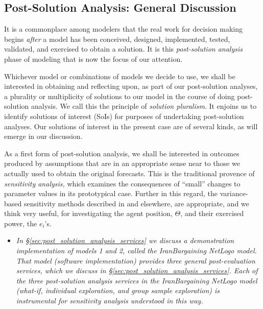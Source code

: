 


\subsection{Post-Solution Analysis: General Discussion}

It is a commonplace among modelers that the real work for decision making begins \emph{after} a model has been conceived, designed, implemented, tested, validated, and exercised to obtain a solution. It is this \emph{post-solution analysis} phase of modeling that is now the focus of our attention.

Whichever model or combinations of models we decide to use, we shall be interested  in obtaining and reflecting upon, as part of our  post-solution analyses, a plurality or multiplicity of solutions to our model in the course of doing post-solution analysis. We call this the principle of \emph{solution pluralism}. It enjoins us to identify solutions of interest (SoIs) for purposes of undertaking post-solution analyses. Our solutions of interest in the present case  are  of several kinds, as will emerge in our discussion.  

As a first form of post-solution analysis, we shall be interested in outcomes produced by assumptions that are in an appropriate sense near to those we actually used to obtain the original forecasts. This is the traditional provence of \emph{sensitivity analysis,} which examines the consequences of ``small'' changes to parameter values in its prototypical case.  Further in this regard, the variance-based sensitivity methods described in 
\cite{saltelli_etal_2000,saltelli_etal_2004,saltelli_etal_2008,saltelli_annoni_etal_2010} and elsewhere, are  appropriate, and we think very useful, for investigating the agent   {position}, $\Theta$, and their   {exercised power}, the $e_i$'s.


\begin{itemize}
\item {\it In \S\ref{sec:post_solution_analysis_services} we discuss a demonstration implementation of models 1 and 2, called the IranBargaining NetLogo model. That model (software implementation) provides three general post-evaluation services, which we discuss in \S\ref{sec:post_solution_analysis_services}. Each of the three post-solution analysis services in the IranBargaining NetLogo model (what-if, individual exploration, and group sample exploration) is instrumental for sensitivity analysis understood in this way.}
\end{itemize}


